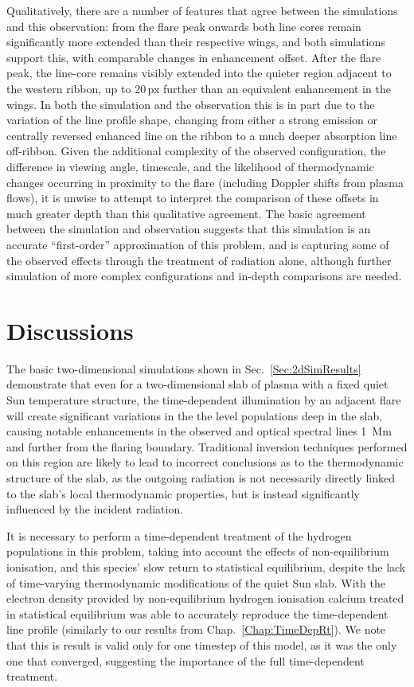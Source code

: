 Qualitatively, there are a number of features that agree between the simulations and this observation: from the flare peak onwards both line cores remain significantly more extended than their respective wings, and both simulations support this, with comparable changes in enhancement offset.
After the flare peak, the line-core remains visibly extended into the quieter region adjacent to the western ribbon, up to 20\,{}px further than an equivalent enhancement in the wings.
In both the simulation and the observation this is in part due to the variation of the line profile shape, changing from either a strong emission or centrally reversed enhanced line on the ribbon to a much deeper absorption line off-ribbon.
Given the additional complexity of the observed configuration, the difference in viewing angle, timescale, and the likelihood of thermodynamic changes occurring in proximity to the flare (including Doppler shifts from plasma flows), it is unwise to attempt to interpret the comparison of these offsets in much greater depth than this qualitative agreement.
The basic agreement between the simulation and observation suggests that this simulation is an accurate ``first-order'' approximation of this problem, and is capturing some of the observed effects through the treatment of radiation alone, although further simulation of more complex configurations and in-depth comparisons are needed.


\section{Discussions}

The basic two-dimensional simulations shown in Sec.~\ref{Sec:2dSimResults} demonstrate that even for a two-dimensional slab of plasma with a fixed quiet Sun temperature structure, the time-dependent illumination by an adjacent flare will create significant variations in the the level populations deep in the slab, causing notable enhancements in the observed \Ha{} and \CaLine{} optical spectral lines \SI{1}{\mega\metre} and further from the flaring boundary.
Traditional inversion techniques performed on this region are likely to lead to incorrect conclusions as to the thermodynamic structure of the slab, as the outgoing radiation is not necessarily directly linked to the slab's local thermodynamic properties, but is instead significantly influenced by the incident radiation.

It is necessary to perform a time-dependent treatment of the hydrogen populations in this problem, taking into account the effects of non-equilibrium ionisation, and this species' slow return to statistical equilibrium, despite the lack of time-varying thermodynamic modifications of the quiet Sun slab.
With the electron density provided by non-equilibrium hydrogen ionisation calcium treated in statistical equilibrium was able to accurately reproduce the time-dependent \CaLine{} line profile (similarly to our results from Chap.~\ref{Chap:TimeDepRt}).
We note that this is result is valid only for one timestep of this model, as it was the only one that converged, suggesting the importance of the full time-dependent treatment.

